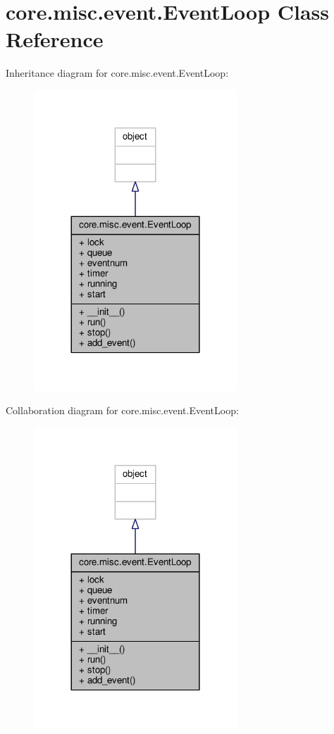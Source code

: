 \hypertarget{classcore_1_1misc_1_1event_1_1_event_loop}{\section{core.\+misc.\+event.\+Event\+Loop Class Reference}
\label{classcore_1_1misc_1_1event_1_1_event_loop}
}


Inheritance diagram for core.\+misc.\+event.\+Event\+Loop\+:
\nopagebreak
\begin{figure}[H]
\begin{center}
\leavevmode
\includegraphics[width=216pt]{classcore_1_1misc_1_1event_1_1_event_loop__inherit__graph}
\end{center}
\end{figure}


Collaboration diagram for core.\+misc.\+event.\+Event\+Loop\+:
\nopagebreak
\begin{figure}[H]
\begin{center}
\leavevmode
\includegraphics[width=216pt]{classcore_1_1misc_1_1event_1_1_event_loop__coll__graph}
\end{center}
\end{figure}
